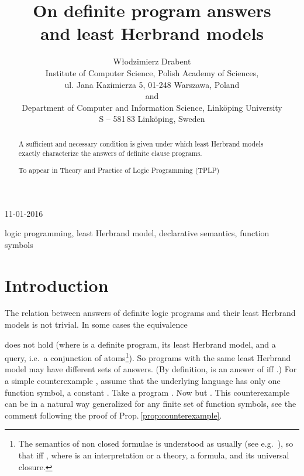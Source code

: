\documentclass[a4paper]{tlp2}
\begin{document}
\title 
[Program answers and least Herbrand models]
{On definite program answers \\ and least Herbrand models}



\author[W. Drabent]
{W{\l}odzimierz Drabent\\
         Institute of Computer Science,
         Polish Academy of Sciences,\\
         ul. Jana Kazimierza 5,
         01-248 Warszawa, Poland
         \\ and \\
Department of Computer and Information Science,
         Link\"oping University\\
         S -- 581\,83   Link\"oping, Sweden      \\
}



\submitted
{11-01-2016}









\maketitle

\begin{abstract}
A sufficient and necessary condition 
is given under which least Herbrand models exactly characterize the answers
of definite clause programs. 

To appear in Theory and Practice of Logic Programming (TPLP)
\end{abstract}

\begin{keywords}
logic programming, least Herbrand model, declarative semantics, function symbols
\end{keywords}



\section{Introduction}
The relation between answers of definite logic programs and their least Herbrand
models is not trivial.
In some cases the equivalence

does not hold
(where  is a definite program,  its least Herbrand model, and  a
query, i.e.\ a conjunction of atoms\footnote
{The semantics of non closed formulae is understood as usually
(see e.g.\  \cite{vanDalen,Apt-Prolog}),
so that  iff
, where  is an interpretation or a
theory,   a formula, and  its
universal closure.}).
So programs with the same least Herbrand model may have different sets of
answers. 
(By definition,  is an answer of  iff .)
For a simple counterexample \cite[Exercise 4.5]{Doets},
assume that the underlying language has only one function symbol, a constant .
Take a program .  
Now  but .
This counterexample can be in a natural way generalized for any  finite set
of function symbols,
see the comment following the proof of Prop.\,\ref{prop:counterexample}.
\end{document}
